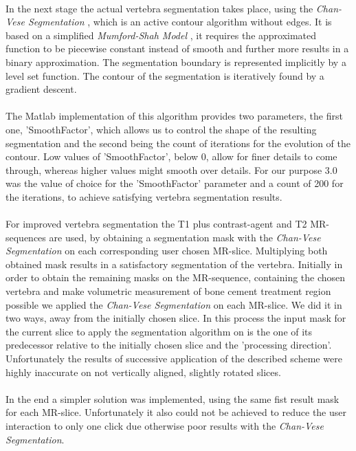 \documentclass{article}
\begin{document}
{    \\In the next stage the actual vertebra segmentation takes place, using the \textit{Chan-Vese Segmentation} \cite{[ChanVese01]}, which is an active contour algorithm without edges. It is based on a simplified \textit{Mumford-Shah Model} \cite{[MumfordShah89]}, it requires the approximated function to be piecewise constant instead of smooth and further more results in a binary approximation. The segmentation boundary is represented implicitly by a level set function. The contour of the segmentation is iteratively found by a gradient descent. \\
    \\ The Matlab implementation of this algorithm provides two parameters, the first one, 'SmoothFactor', which allows us to control the shape of the resulting segmentation and the second being the count of iterations for the evolution of the contour.
    Low values of 'SmoothFactor', below 0, allow for finer details to come through, whereas higher values might smooth over details. For our purpose 3.0 was the value of choice for the 'SmoothFactor' parameter and a count of 200 for the iterations, to achieve satisfying vertebra segmentation results.\\
    \\For improved vertebra segmentation the T1 plus contrast-agent and T2 MR-sequences are used, by obtaining a segmentation mask with the \textit{Chan-Vese Segmentation} \cite{[ChanVese01]} on each corresponding user chosen MR-slice. Multiplying both obtained mask results in a satisfactory segmentation of the vertebra.  
    Initially in order to obtain the remaining masks on the MR-sequence, containing the chosen vertebra and make volumetric measurement of bone cement treatment region possible we applied the \textit{Chan-Vese Segmentation} \cite{[ChanVese01]} on each MR-slice. \newline 
    We did it in two ways, away from the initially chosen slice. In this process the input mask for the current slice to apply the segmentation algorithm on is the one of its predecessor relative to the initially chosen slice and the 'processing direction'.
    Unfortunately the results of successive application of the described scheme were highly inaccurate on not vertically aligned, slightly rotated slices.\\
    \\In the end a simpler solution was implemented, using the same fist result mask for each MR-slice. Unfortunately it also could not be achieved to reduce the user interaction to only one click due otherwise poor results with the \textit{Chan-Vese Segmentation}. 
}
\end{document}

